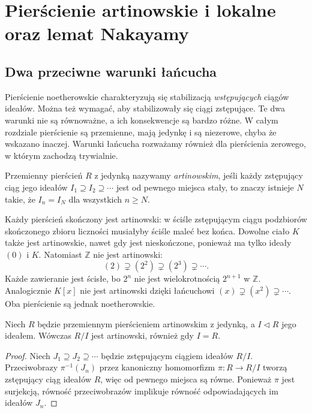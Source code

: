 \chapter[Pierścienie artinowskie i lokalne]{Pierścienie artinowskie i lokalne oraz lemat Nakayamy}
\label{aa:ch:artin-local}

\providecommand{\atlasref}[2]{#2}
\setlength{\parskip}{2pt}

\section{Dwa przeciwne warunki łańcucha}
Pierścienie noetherowskie charakteryzują się stabilizacją
\emph{wstępujących} ciągów ideałów. Można też wymagać,
aby stabilizowały się ciągi zstępujące. Te dwa warunki
nie są równoważne, a ich konsekwencje są bardzo różne.
W całym rozdziale pierścienie są przemienne, mają jedynkę
i są niezerowe, chyba że wskazano inaczej. Warunki łańcucha
rozważamy również dla pierścienia zerowego, w którym zachodzą
trywialnie.

\begin{definicja}
\label{aa:def:artinian-ring}
Przemienny pierścień $R$ z jedynką nazywamy
\emph{artinowskim}, jeśli każdy
zstępujący ciąg jego ideałów
$I_1\supseteq I_2\supseteq\cdots$ jest od pewnego miejsca
stały, to znaczy istnieje $N$ takie, że
$I_n=I_N$ dla wszystkich $n\ge N$.
\end{definicja}

\begin{przyklad}
\label{aa:prz:artin-basic}
Każdy pierścień skończony jest artinowski: w ściśle
zstępującym ciągu podzbiorów skończonego zbioru
liczności musiałyby ściśle maleć bez końca.
Dowolne ciało $K$ także jest artinowskie, nawet gdy
jest nieskończone, ponieważ ma tylko ideały $(0)$ i $K$.
Natomiast $\mathbb Z$ nie jest artinowski:
\[
 (2)\supsetneq(2^2)\supsetneq(2^3)\supsetneq\cdots.
\]
Każde zawieranie jest ścisłe, bo $2^n$ nie jest
wielokrotnością $2^{n+1}$ w $\mathbb Z$.
Analogicznie $K[x]$ nie jest artinowski dzięki
łańcuchowi $(x)\supsetneq(x^2)\supsetneq\cdots$.
Oba pierścienie są jednak noetherowskie.
\end{przyklad}

\begin{lemat}
\label{aa:lem:artin-quotient}
Niech $R$ będzie przemiennym pierścieniem artinowskim
z jedynką, a $I\triangleleft R$ jego ideałem.
Wówczas $R/I$ jest artinowski, również gdy $I=R$.
\end{lemat}
\begin{proof}
Niech $J_1\supseteq J_2\supseteq\cdots$ będzie
zstępującym ciągiem ideałów $R/I$.
Przeciwobrazy $\pi^{-1}(J_n)$ przez kanoniczny
homomorfizm $\pi:R\to R/I$ tworzą zstępujący ciąg
ideałów $R$, więc od pewnego miejsca są równe.
Ponieważ $\pi$ jest surjekcją, równość przeciwobrazów
implikuje równość odpowiadających im ideałów $J_n$.
\end{proof}

